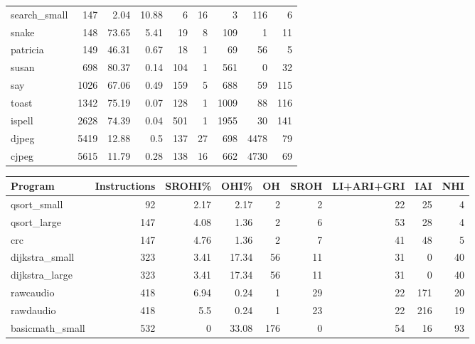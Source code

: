 \begin{tabular}{lrrrrrrrr}
 search\_small    &      147 &     2.04 &  10.88 &    6 &   16 &      3 &   116 &     6 \\
 snake           &      148 &    73.65 &   5.41 &   19 &    8 &    109 &     1 &    11 \\
 patricia        &      149 &    46.31 &   0.67 &   18 &    1 &     69 &    56 &     5 \\
 susan           &      698 &    80.37 &   0.14 &  104 &    1 &    561 &     0 &    32 \\
 say             &     1026 &    67.06 &   0.49 &  159 &    5 &    688 &    59 &   115 \\
 toast           &     1342 &    75.19 &   0.07 &  128 &    1 &   1009 &    88 &   116 \\
 ispell          &     2628 &    74.39 &   0.04 &  501 &    1 &   1955 &    30 &   141 \\
 djpeg           &     5419 &    12.88 &   0.5  &  137 &   27 &    698 &  4478 &    79 \\
 cjpeg           &     5615 &    11.79 &   0.28 &  138 &   16 &    662 &  4730 &    69 \\
\hline
\end{tabular}\begin{tabular}{lrrrrrrrr}
\hline
 Program         &   Instructions &   SROHI\% &   OHI\% &   OH &   SROH &   LI+ARI+GRI &   IAI &   NHI \\
\hline
 qsort\_small     &             92 &     2.17 &   2.17 &    2 &      2 &           22 &    25 &     4 \\
 qsort\_large     &            147 &     4.08 &   1.36 &    2 &      6 &           53 &    28 &     4 \\
 crc             &            147 &     4.76 &   1.36 &    2 &      7 &           41 &    48 &     5 \\
 dijkstra\_small  &            323 &     3.41 &  17.34 &   56 &     11 &           31 &     0 &    40 \\
 dijkstra\_large  &            323 &     3.41 &  17.34 &   56 &     11 &           31 &     0 &    40 \\
 rawcaudio       &            418 &     6.94 &   0.24 &    1 &     29 &           22 &   171 &    20 \\
 rawdaudio       &            418 &     5.5  &   0.24 &    1 &     23 &           22 &   216 &    19 \\
 basicmath\_small &            532 &     0    &  33.08 &  176 &      0 &           54 &    16 &    93 \\

\end{tabular}
